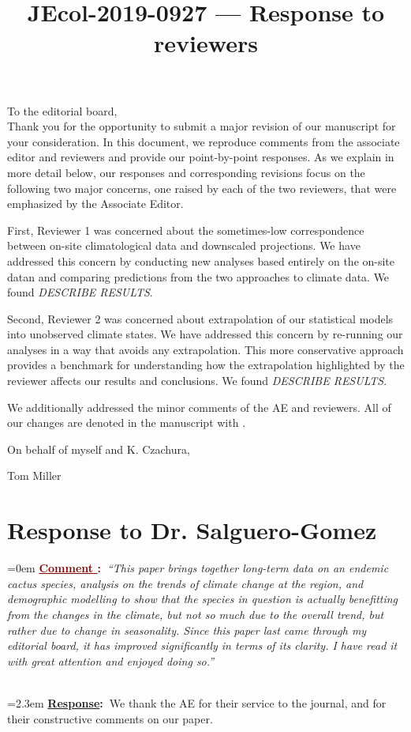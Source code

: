 \documentclass[12pt]{article}
\newcounter{cN}
\newcommand{\comment}[1]{
	\vspace{2em}
	\refstepcounter{cN} %
	\noindent \hangindent=0em \textbf{\textcolor{Maroon}{\uline{Comment \thecN}:~}}\emph{``#1''}
	}
\newcommand{\response}[1]{
	\\[0.25em]
	\hangindent=2.3em \textbf{\textcolor{NavyBlue}{\uline{Response}:~}}#1
	}
\newcommand{\revise}[1]{{\color{Mahogany}{#1}}}
\begin{document}
\title{JEcol-2019-0927 --- Response to reviewers}

\maketitle
\noindent To the editorial board,\\

Thank you for the opportunity to submit a major revision of our manuscript for your consideration. 
In this document, we reproduce comments from the associate editor and reviewers and provide our point-by-point responses. As we explain in more detail below, our responses and corresponding revisions focus on the following two major concerns, one raised by each of the two reviewers, that were emphasized by the Associate Editor.

First, Reviewer 1 was concerned about the sometimes-low correspondence between on-site climatological data and downscaled projections. 
We have addressed this concern by conducting new analyses based entirely on the on-site datan and comparing predictions from the two approaches to climate data. 
We found \textit{DESCRIBE RESULTS}.

Second, Reviewer 2 was concerned about extrapolation of our statistical models into unobserved climate states. 
We have addressed this concern by re-running our analyses in a way that avoids any extrapolation.
This more conservative approach provides a benchmark for understanding how the extrapolation highlighted by the reviewer affects our results and conclusions.
We found \textit{DESCRIBE RESULTS}.

We additionally addressed the minor comments of the AE and reviewers. 
All of our changes are denoted in the manuscript with \revise{Mahogany font}.

\vspace{2em}
\hfill On behalf of myself and K. Czachura,

\hfill Tom Miller
\newpage



\section{Response to Dr. Salguero-Gomez}
\vspace{-2em}

\comment{This paper brings together long-term data on an endemic cactus species, analysis on the trends of climate change at the region, and demographic modelling to show that the species in question is actually benefitting from the changes in the climate, but not so much due to the overall trend, but rather due to change in seasonality. Since this paper last came through my editorial board, it has improved significantly in terms of its clarity. I have read it with great attention and enjoyed doing so.}
\response{We thank the AE for their service to the journal, and for their constructive comments on our paper.}
\end{document}
